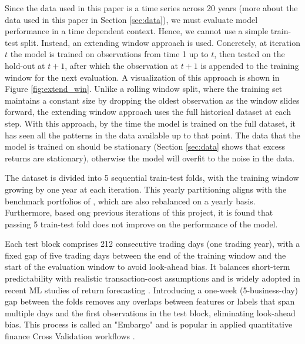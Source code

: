 Since the data used in this paper is a time series across 20 years (more about the data used in this paper in Section \ref{sec:data}), we must evaluate model performance in a time dependent context. Hence, we cannot use a simple train-test split. Instead, an extending window approach is used. Concretely, at iteration $t$ the model is trained on observations from time 1 up to $t$, then tested on the hold-out at $t+1$, after which the observation at $t+1$ is appended to the training window for the next evaluation. A visualization of this approach is shown in Figure \ref{fig:extend_win}. Unlike a rolling window split, where the training set maintains a constant size by dropping the oldest observation as the window slides forward, the extending window approach uses the full historical dataset at each step. With this approach, by the time the model is trained on the full dataset, it has seen all the patterns in the data available up to that point. The data that the model is trained on should be stationary (Section \ref{sec:data} shows that excess returns are stationary), otherwise the model will overfit to the noise in the data.

The dataset is divided into 5 sequential train-test folds, with the training window growing by one year at each iteration. This yearly partitioning aligns with the benchmark portfolios of , which are also rebalanced on a yearly basis. Furthermore, based ong previous iterations of this project, it is found that passing 5 train-test fold does not improve on the performance of the model. 

Each test block comprises 212 consecutive trading days (one trading year), with a fixed gap of five trading days between the end of the training window and the start of the evaluation window to avoid look-ahead bias. It balances short-term predictability with realistic transaction-cost assumptions and is widely adopted in recent ML studies of return forecasting \cite{htun_2024}. Introducing a one-week (5-business-day) gap between the folds removes any overlaps between features or labels that span multiple days and the first observations in the test block, eliminating look-ahead bias. This process is called an "Embargo" and is popular in applied quantitative finance Cross Validation workflows \cite{embargo_2020}. %



